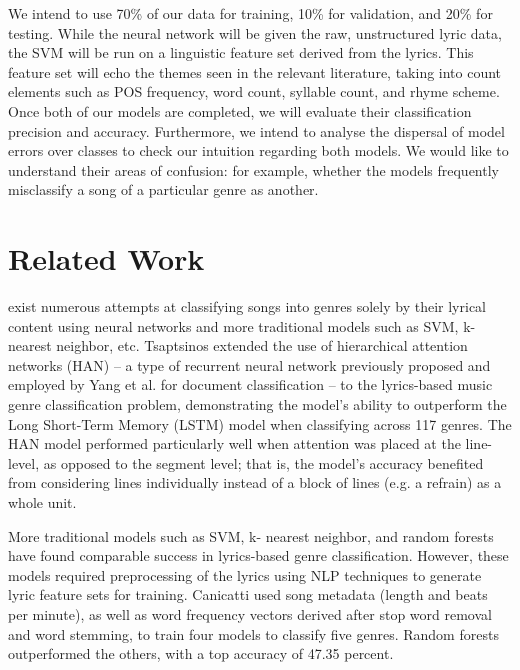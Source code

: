\documentclass[journal]{IEEEtran}
\begin{document}
We intend to use 70\% of our data for training, 10\% for validation, and 20\% for testing. While the neural network will be given the raw, unstructured lyric data, the SVM will be run on a linguistic feature set derived from the lyrics. This feature set will echo the themes seen in the relevant literature, taking into count elements such as POS frequency, word count, syllable count, and rhyme scheme. Once both of our models are completed, we will evaluate their classification precision and accuracy. Furthermore, we intend to analyse the dispersal of model errors over classes to check our intuition regarding both models. We would like to understand their areas of confusion: for example, whether the models frequently misclassify a song of a particular genre as another.



\section{Related Work}

 exist numerous attempts at classifying songs into genres solely by their lyrical content using neural networks and more traditional models such as SVM, k-nearest neighbor, etc.
Tsaptsinos \cite{tsaptsinos} extended the use of hierarchical attention networks (HAN) -- a type of recurrent neural network previously proposed and employed by Yang et al. \cite{Yang} for document classification -- to the lyrics-based music genre classification problem, demonstrating the model's ability to outperform the Long Short-Term Memory (LSTM) model when classifying across 117 genres. The HAN model performed particularly well when attention was placed at the line-level, as opposed to the segment level; that is, the model's accuracy benefited from considering lines individually instead of a block of lines (e.g. a refrain) as a whole unit. \par

More traditional models such as SVM, k- nearest neighbor, and random forests have found comparable success in lyrics-based genre classification. However, these models required preprocessing of the lyrics using NLP techniques to generate lyric feature sets for training. Canicatti \cite{canicatti} used song metadata (length and beats per minute), as well as word frequency vectors derived after stop word removal and word stemming, to train four models to classify five genres. Random forests outperformed the others, with a top accuracy of 47.35 percent. \par
\end{document}
